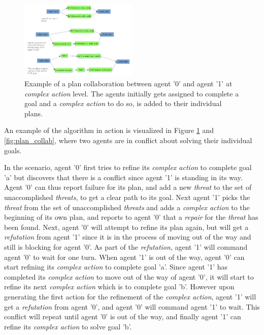 \documentclass[Main]{subfiles}
\begin{document}
\begin{figure}[h!]
	\centering
	\includegraphics[width=0.5\textwidth]{unhtnpop.png}
	\caption{Example of a plan collaboration between agent '0' and agent '1' at \textit{complex action} level. The agents initially gets assigned to complete a goal and a \textit{complex action} to do so, is added to their individual plans.}
	\label{fig:htn_collab}
\end{figure}

An example of the algorithm in action is visualized in Figure \ref{fig:htn_collab} and \ref{fig:plan_collab}, where two agents are in conflict about solving their individual goals.

In the scenario, agent '0' first tries to refine its \textit{complex action} to complete goal 'a' but discovers that there is a conflict since agent '1' is standing in its way.
Agent '0' can thus report failure for its plan, and add a new \textit{threat} to the set of unaccomplished \textit{threats}, to get a clear path to its goal.
Next agent '1' picks the \textit{threat} from the set of unaccomplished \textit{threats} and adds a \textit{complex action} to the beginning of its own plan, and reports to agent '0' that a \textit{repair} for the \textit{threat} has been found.
Next, agent '0' will attempt to refine its plan again, but will get a \textit{refutation} from agent '1' since it is in the process of moving out of the way and still is blocking for agent '0'.
As part of the \textit{refutation}, agent '1' will command agent '0' to wait for one turn.
When agent '1' is out of the way, agent '0' can start refining its \textit{complex action} to complete goal 'a'.
Since agent '1' has completed its \textit{complex action} to move out of the way of agent '0', it will start to refine its next \textit{complex action} which is to complete goal 'b'.
However upon generating the first action for the refinement of the \textit{complex action}, agent '1' will get a \textit{refutation} from agent '0', and agent '0' will command agent '1' to wait.
This conflict will repeat until agent '0' is out of the way, and finally agent '1' can refine its \textit{complex action} to solve goal 'b'.




\end{document}
